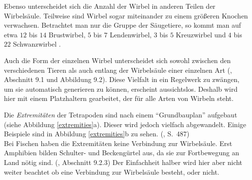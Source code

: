 Ebenso unterscheidet sich die Anzahl der Wirbel in anderen Teilen der Wirbelsäule. Teilweise sind Wirbel sogar miteinander zu einem größeren Knochen verwachsen. Betrachtet man nur die Gruppe der Säugetiere, so kommt man auf etwa $12$ bis $14$ Brustwirbel, $5$ bis $7$ Lendenwirbel, $3$ bis $5$ Kreuzwirbel und $4$ bis $22$ Schwanzwirbel \cite{AnatomieKuenstler}.

Auch die Form der einzelnen Wirbel unterscheidet sich sowohl zwischen den verschiedenen Tieren als auch entlang der Wirbelsäule einer einzelnen Art (\cite{Vergleichende_Anatomie}, Abschnitt 9.1 und Abbildung 9.2). Diese Vielfalt in ein Regelwerk zu zwängen, um sie automatisch generieren zu können, erscheint aussichtslos. Deshalb wird hier mit einem Platzhaltern gearbeitet, der für alle Arten von Wirbeln steht.

Die \emph{Extremitäten} der Tetrapoden sind nach einem "`Grundbauplan"' aufgebaut (siehe Abbildung \ref{extremities}a). Dieser wird jedoch vielfach abgewandelt. Einige Beispiele sind in Abbildung \ref{extremities}b zu sehen. (\cite{AllgemeineZoologie}, S.\ 487)\\
Bei Fischen haben die Extremitäten keine Verbindung zur Wirbelsäule. Erst Amphibien bilden Schulter- und Beckengürtel aus, da sie zur Fortbewegung an Land nötig sind. (\cite{Vergleichende_Anatomie}, Abschnitt 9.2.3)
Der Einfachheit halber wird hier aber nicht weiter beachtet ob eine Verbindung zur Wirbelsäule besteht, oder nicht. 

